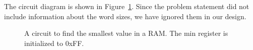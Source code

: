 The circuit diagram is  shown in Figure~\ref{fig:sequentialBBmin}.  Since the 
problem statement did not include information about the word sizes, we have
ignored them in our design.  

\begin{figure}[ht]
\caption{A circuit to find the smallest value in a RAM.  The min 
register is initialized to 0xFF.}
\label{fig:sequentialBBmin}
\end{figure}

